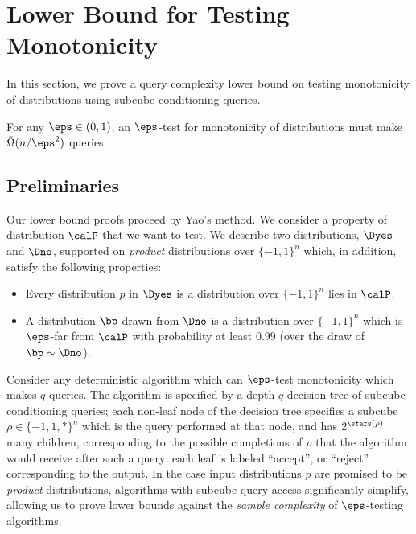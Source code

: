 
\section{Lower Bound for Testing Monotonicity}\label{sec:mon-lb}

In this section, we prove a query complexity lower bound on testing monotonicity of distributions using subcube conditioning queries.
\begin{theorem}\label{thm:mon-lb}
For any $\eps \in (0,1)$, an $\eps$-test for monotonicity of distributions must make $\tilde{\Omega}(n/\eps^2)$ queries.
\end{theorem}

\subsection{Preliminaries} \label{sec:prelims}

Our lower bound proofs proceed by Yao's method. We consider a property of distribution $\calP$ that we want to test.
We describe two distributions, $\Dyes$ and $\Dno$, supported on \emph{product} distributions over $\{-1,1\}^n$ which, in addition, satisfy the following properties:
\begin{itemize}
\item Every distribution $p$ in $\Dyes$ is a distribution over $\{-1,1\}^n$ lies in $\calP$.
\item A distribution $\bp$ drawn from $\Dno$ is a distribution over $\{-1,1\}^n$ which is $\eps$-far from $\calP$ with probability at least $0.99$ (over the draw of $\bp \sim \Dno$).   
\end{itemize}
Consider any deterministic algorithm which can $\eps$-test monotonicity which makes $q$ queries. The algorithm is specified by a depth-$q$ decision tree of subcube conditioning queries; each non-leaf node of the decision tree specifies a subcube $\rho \in \{-1,1, *\}^n$ which is the query performed at that node, and has $2^{\stars(\rho)}$ many children, corresponding to the possible completions of $\rho$ that the algorithm would receive after such a query; each leaf is labeled ``accept'', or ``reject'' corresponding to the output. In the case input distributions $p$ are promised to be \emph{product} distributions, algorithms with subcube query access significantly simplify, allowing us to prove lower bounds against the \emph{sample complexity} of $\eps$-testing algorithms.

